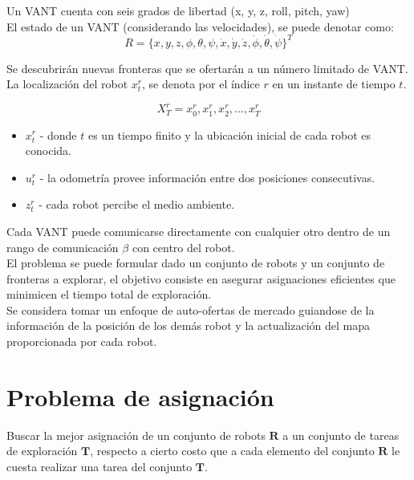 \documentclass[12pt]{article}
\begin{document}

Un VANT cuenta con seis grados de libertad (x, y, z, roll, pitch, yaw) \\

El estado de un VANT (considerando las velocidades), se puede denotar como:\\
\[
R = \{x, y, z, \phi, \theta, \psi, \dot{x}, \dot{y}, \dot{z}, \dot{\phi}, \dot{\theta}, \dot{\psi}\}^T
\]

Se descubrirán nuevas fronteras que se ofertarán a un número limitado de VANT.\\

La localización del robot $x_{t}^{r}$, se denota por el índice $r$ en un instante de tiempo $t$.

\[
X_{T}^{r} = {x_{0}^{r},x_{1}^{r},x_{2}^{r},...,x_{T}^{r}}
\]

\begin{itemize}
\item $x_{t}^{r}$ - donde $t$ es un tiempo finito y la ubicación inicial de cada robot es conocida.
\item $u_{t}^{r}$ - la odometría provee información entre dos posiciones consecutivas.
\item $z_{t}^{r}$ - cada robot percibe el medio ambiente.
\end{itemize}

Cada VANT puede comunicarse directamente con cualquier otro dentro de un rango de comunicación $\beta$ con centro del robot.\\


El problema se puede formular dado un conjunto de robots y un conjunto de fronteras a explorar, el objetivo consiste en asegurar asignaciones eficientes que minimicen el tiempo total de exploración.\\

Se considera tomar un enfoque de auto-ofertas de mercado guiandose de la información de la posición de los demás robot y la actualización del mapa proporcionada por cada robot.\\

\section{Problema de asignación}

Buscar la mejor asignación de un conjunto de robots $\mathbf{R}$ a un conjunto de tareas de exploración $\mathbf{T}$, respecto a cierto costo que a cada elemento del conjunto $\mathbf{R}$ le cuesta realizar una tarea del conjunto $\mathbf{T}$.\\
\end{document}
